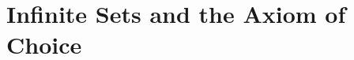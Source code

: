 \documentclass[../main.tex]{subfiles}
\begin{document}
\section{Infinite Sets and the Axiom of Choice}
%
\todo{}
\end{document}
